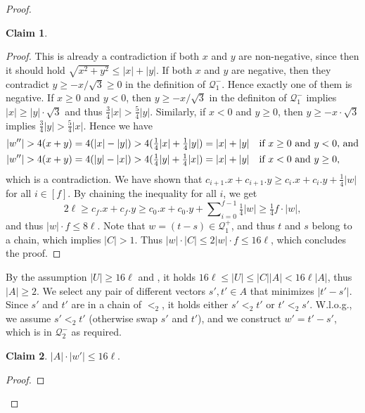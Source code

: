 \documentclass[11pt, letterpaper]{article}
\theoremstyle{plain}
\theoremstyle{definition}
\newtheorem{claim}{Claim}
\theoremstyle{remark}
\newcommand{\Q}{\mathcal{Q}}
\newcommand{\absolute}[1]{\lvert#1\rvert}
\begin{document}
\begin{proof}
\begin{claim}
\begin{proof}
		This is already a contradiction if both $x$ and $y$ are non-negative, since then it should hold $\sqrt{x^2 + y^2} \leq \absolute{x} + \absolute{y}$. If both $x$ and $y$ are negative, then they contradict $y \geq -x/\sqrt{3} \geq 0$ in the definition of $\Q_1^-$. Hence exactly one of them is negative. If $x \geq 0$ and $y < 0$, then $y \geq -x / \sqrt{3}$ in the definiton of $\Q_1^-$ implies $\absolute{x} \geq \absolute{y}\cdot \sqrt{3}$ and thus $\frac34\absolute{x} > \frac54\absolute{y}$. Similarly, if $x < 0$ and $y \geq 0$, then $y \geq -x \cdot \sqrt{3}$ implies $\frac34\absolute{y} > \frac54\absolute{x}$. Hence we have
	\begin{alignat*}{1}	
		\absolute{w''} > 4(x + y) = 
		4(\absolute{x} - \absolute{y}) > 
		4(\tfrac14\absolute{x} + \tfrac14\absolute{y}) = 
		\absolute{x} + \absolute{y}&\text{\quad if $x \geq 0$ and $y < 0$, and}\\
		\absolute{w''} > 4(x + y) = 
		4(\absolute{y} - \absolute{x}) > 
		4(\tfrac14\absolute{y} + \tfrac14\absolute{x}) = 
		\absolute{x} + \absolute{y}&\text{\quad if $x < 0$ and $y \geq 0$,}
	\end{alignat*}
	which is a contradiction.
	We have shown that $c_{i + 1}.x + c_{i + 1}.y \geq c_i.x + c_i.y + \frac14\absolute{w}$ for all $i \in [f]$. By chaining the inequality for all $i$, we get $$2\ell \geq c_f.x + c_f.y \geq c_0.x + c_0.y + \sum\nolimits_{i = 0}^{f - 1} \tfrac14\absolute{w} \geq \tfrac14f\cdot{\absolute{w}},$$ and thus $\absolute{w} \cdot f \leq 8\ell$. Note that $w = (t - s) \in \Q_1^+$, and thus $t$ and $s$ belong to a chain, which implies $\absolute{C} > 1$. Thus $\absolute{w} \cdot \absolute{C} \leq 2\absolute{w} \cdot f \leq 16\ell$, which concludes the proof.
	\end{proof}%
\end{claim}

By the assumption $|U| \ge 16\ell$ and , it holds
$16 \ell \le |U| \le |C| |A| < 16\ell|A|$,
thus $|A| \ge 2$.
We select any pair of different vectors $s', t' \in A$ that minimizes $|t' - s'|$. Since $s'$ and $t'$ are in a chain of $<_2$, it holds either $s' <_2 t'$ or $t' <_2 s'$. W.l.o.g., we assume $s' <_2 t'$ (otherwise swap $s'$ and $t'$), and we construct $w' = t' - s'$, which is in $\Q_2^-$ as required.

\begin{claim}\label{A_ineq}
	$\absolute{A}\cdot \absolute{w'} \leq 16\ell$. 
	\begin{proof}
	

\end{proof}
\end{claim}
\end{proof}
\end{document}
